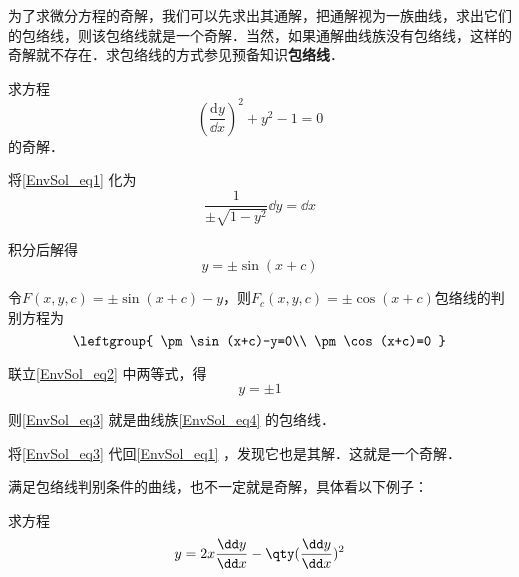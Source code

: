 为了求微分方程的奇解，我们可以先求出其通解，把通解视为一族曲线，求出它们的包络线，则该包络线就是一个奇解．当然，如果通解曲线族没有包络线，这样的奇解就不存在．求包络线的方式参见预备知识\textbf{包络线}．

\begin{example}{}
求方程
\begin{equation}\label{EnvSol_eq1}
(\frac{\mathrm{d} y}{\dd x})^2+y^2-1=0
\end{equation}
的奇解．

将\autoref{EnvSol_eq1} 化为
\begin{equation}
\frac{1}{\pm\sqrt{1-y^2}}\dd y=\dd x
\end{equation}

积分后解得
\begin{equation}\label{EnvSol_eq4}
y=\pm\sin(x+c)
\end{equation}

令$F(x, y, c)=\pm\sin(x+c)-y$，则$F_c(x, y, c)=\pm\cos(x+c)$包络线的判别方程为
\begin{equation}\label{EnvSol_eq2}
\leftgroup{
    \pm\sin(x+c)-y=0\\
    \pm\cos(x+c)=0
}
\end{equation}

联立\autoref{EnvSol_eq2} 中两等式，得
\begin{equation}\label{EnvSol_eq3}
y=\pm 1
\end{equation}

则\autoref{EnvSol_eq3} 就是曲线族\autoref{EnvSol_eq4} 的包络线．

将\autoref{EnvSol_eq3} 代回\autoref{EnvSol_eq1} ，发现它也是其解．这就是一个奇解．


\end{example}


满足包络线判别条件的曲线，也不一定就是奇解，具体看以下例子：

\begin{example}{}
求方程
\begin{equation}
y=2x\frac{\dd y}{\dd x}-\qty(\frac{\dd y}{\dd x})^2
\end{equation}
\end{example}























